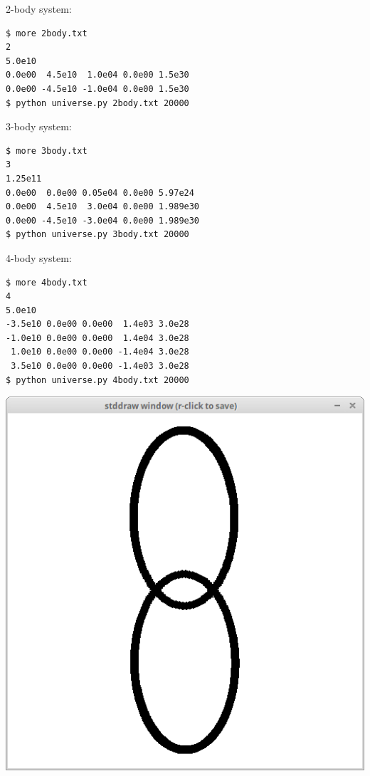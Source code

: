 \documentclass[8pt,a4paper,compress,handout]{beamer}
\begin{document}
\begin{frame}[fragile]
\begin{minipage}{200pt}
2-body system:
\begin{lstlisting}[language={}]
$ more 2body.txt
2 
5.0e10 
0.0e00  4.5e10  1.0e04 0.0e00 1.5e30 
0.0e00 -4.5e10 -1.0e04 0.0e00 1.5e30 
$ python universe.py 2body.txt 20000
\end{lstlisting}

\bigskip

3-body system:
\begin{lstlisting}[language={}]
$ more 3body.txt
3 
1.25e11 
0.0e00  0.0e00 0.05e04 0.0e00 5.97e24 
0.0e00  4.5e10  3.0e04 0.0e00 1.989e30 
0.0e00 -4.5e10 -3.0e04 0.0e00 1.989e30 
$ python universe.py 3body.txt 20000
\end{lstlisting}

\bigskip

4-body system:
\begin{lstlisting}[language={}]
$ more 4body.txt
4 
5.0e10 
-3.5e10 0.0e00 0.0e00  1.4e03 3.0e28 
-1.0e10 0.0e00 0.0e00  1.4e04 3.0e28 
 1.0e10 0.0e00 0.0e00 -1.4e04 3.0e28 
 3.5e10 0.0e00 0.0e00 -1.4e03 3.0e28 
$ python universe.py 4body.txt 20000
\end{lstlisting}
\end{minipage}%
\hfill
\begin{minipage}{100pt}
\begin{center}
\includegraphics[scale=0.13]{figures/2body.png}


\end{center}
\end{minipage}
\end{frame}
\end{document}
